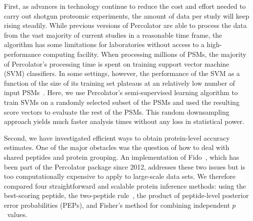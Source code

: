 \documentclass{article}
\begin{document}
First, as advances in technology continue to reduce the cost and
effort needed to carry out shotgun proteomic experiments, the amount
of data per study will keep rising steadily. While previous versions
of Percolator are able to process the data from the vast majority of
current studies in a reasonable time frame, the algorithm has some
limitations for laboratories without access to a high-performance
computing facility. When processing millions of PSMs, the majority of
Percolator's processing time is spent on training support vector
machine (SVM) classifiers.  In some settings, however, the performance
of the SVM as a function of the size of its training set plateaus at
an relatively low number of input PSMs~\cite{gonnelli2015decoy}. Here,
we use Percolator's semi-supervised learning algorithm to train SVMs
on a randomly selected subset of the PSMs and used the resulting score
vectors to evaluate the rest of the PSMs.  This random downsampling
approach yields much faster analysis times without any loss in
statistical power.

Second, we have investigated efficient ways to obtain protein-level 
accuracy estimates. One of the major obstacles was the question of how 
to deal with shared peptides and protein grouping. An implementation 
of Fido~\cite{serang2010efficient}, which has been part of the 
Percolator package since 2012, addresses these two issues but is too 
computationally expensive to apply to large-scale data sets. We 
therefore compared four straightforward and scalable protein inference 
methods: using the best-scoring peptide, the two-peptide 
rule~\cite{carr2004need, gupta2009false}, the product of 
peptide-level posterior error probabilities (PEPs), and Fisher's 
method for combining independent $p$~values.
\end{document}
